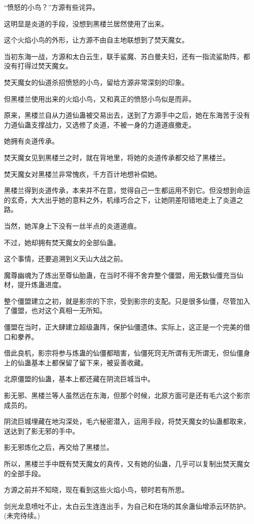 \begin{this_body}
“愤怒的小鸟？”方源有些诧异。

这明显是炎道的手段，没想到黑楼兰居然使用了出来。

这个火焰小鸟的外形，让方源不由自主地联想到了焚天魔女。

当初东海一战，方源和太白云生，联手鲨魔、苏白曼夫妇，还有一指流鲨助阵，都没有打得过焚天魔女。

焚天魔女的仙道杀招愤怒的小鸟，留给方源非常深刻的印象。

但黑楼兰使用出来的火焰小鸟，又和真正的愤怒小鸟似是而非。

原来，黑楼兰自从力道仙蛊被交易出去，送到了方源手中之后，她在东海苦于没有力道仙蛊支撑战力，又选修了炎道，不被一身的力道道痕撤走。

她拥有炎道传承。

焚天魔女见到黑楼兰之时，就在背地里，将她的炎道传承都交给了黑楼兰。

焚天魔女对黑楼兰非常愧疚，千方百计地想补偿她。

黑楼兰得到炎道传承，本来并不在意，觉得自己一生都运用不到它。但没想到命运的玄奇，大大出乎她的意料之外，机缘巧合之下，让她阴差阳错地走上了炎道之路。

当然，她浑身上下没有一丝半点的炎道道痕。

不过，她却拥有焚天魔女的全部仙蛊。

这个事情，还要追溯到义天山大战之前。

魔尊幽魂为了炼出至尊仙胎蛊，在当时不得不舍弃整个僵盟，用无数仙僵充当仙材，提升炼蛊进度。

整个僵盟建立之初，就是影宗的下宗，受到影宗的支配。只是很多仙僵，尽管加入了僵盟，也对这个真相一无所知。

僵盟在当时，正大肆建立超级蛊阵，保护仙僵遗体。实际上，这正是一个完美的借口和豢养。

借此良机，影宗将参与炼蛊的仙僵都暗害，仙僵死窍无所谓有无所谓无，但仙僵身上的仙蛊基本上都保留了留下来，被妥善收藏。

北原僵盟的仙蛊，基本上都还藏在阴流巨城当中。

影无邪、黑楼兰等人虽然远在东海，但那个时候，北原方面可是还有毛六这个影宗成员的。

阴流巨城埋藏在地沟深处，毛六秘密潜入，运用手段，将焚天魔女的仙蛊都取来，送达到了影无邪的手中。

影无邪炼化之后，再交给了黑楼兰。

所以，黑楼兰手中既有焚天魔女的真传，又有她的仙蛊，几乎可以复制出焚天魔女的全部手段。

方源之前并不知晓，现在看到这些火焰小鸟，顿时若有所思。

剑光龙息喷吐不止，太白云生连连出手，为自己和在场的其余蛊仙增添云环防护。(未完待续。)

\end{this_body}

